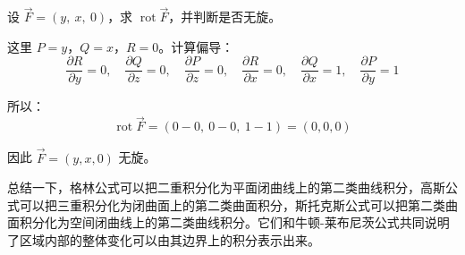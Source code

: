 \begin{myexample}
设 $\vec{F}=(y,\ x,\ 0)$，求 $\operatorname{rot}\vec{F}$，并判断是否无旋。

这里 $P=y$，$Q=x$，$R=0$。计算偏导：
\[
\frac{\partial R}{\partial y}=0,\quad \frac{\partial Q}{\partial z}=0,\quad
\frac{\partial P}{\partial z}=0,\quad \frac{\partial R}{\partial x}=0,\quad
\frac{\partial Q}{\partial x}=1,\quad \frac{\partial P}{\partial y}=1
\]

所以：
\[
\operatorname{rot}\vec{F}
=
(0-0,\ 0-0,\ 1-1)
=
(0,0,0)
\]

因此 $\vec{F}=(y,x,0)$ 无旋。
\end{myexample}

总结一下，格林公式可以把二重积分化为平面闭曲线上的第二类曲线积分，高斯公式可以把三重积分化为闭曲面上的第二类曲面积分，斯托克斯公式可以把第二类曲面积分化为空间闭曲线上的第二类曲线积分。它们和牛顿-莱布尼茨公式共同说明了区域内部的整体变化可以由其边界上的积分表示出来。